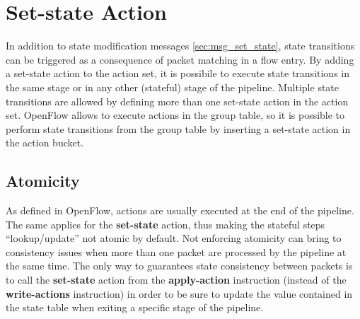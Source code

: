 
\section{Set-state Action}
\label{sec:act_set_state}
In addition to state modification messages \ref{sec:msg_set_state}, state transitions can be triggered as a consequence of packet matching in a flow entry. By adding a set-state action to the action set, it is possibile to execute state transitions in the same stage or in any other (stateful) stage of the pipeline. Multiple state transitions are allowed by defining more than one set-state action in the action set.
OpenFlow allows to execute actions in the group table, so it is possible to perform state transitions from the group table by inserting a set-state action in the action bucket.

\subsection{Atomicity}
As defined in OpenFlow, actions are usually executed at the end of the pipeline. The same applies for the \textbf{set-state} action, thus making the stateful steps ``lookup/update'' not atomic by default. Not enforcing atomicity can bring to consistency issues when more than one packet are processed by the pipeline at the same time. The only way to guarantees state consistency between packets is to call the \textbf{set-state} action from the \textbf{apply-action} instruction (instead of the \textbf{write-actions} instruction) in order to be sure to update the value contained in the state table when exiting a specific stage of the pipeline.



